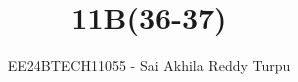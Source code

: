 \documentclass[journal]{IEEEtran}
\begin{document}

\vspace{3cm}

\title{11B(36-37)}
\author{EE24BTECH11055 - Sai Akhila Reddy Turpu}
{\let\newpage\relax\maketitle}

\renewcommand{\thefigure}{\theenumi}
\renewcommand{\thetable}{\theenumi}
\setlength{\intextsep}{10pt} %


\renewcommand{\thetable}{\theenumi}
\end{document}

